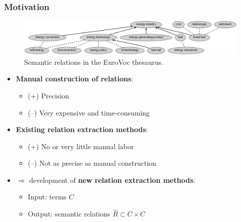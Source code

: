 \documentclass{beamer}
\begin{document}
\begin{frame}
\frametitle{Motivation}

\begin{figure}	
	\centering
		\includegraphics[width=1.0\textwidth]{figures/thesaurus2}
		\caption{Semantic relations in the EuroVoc thesaurus.}
\end{figure}

\pause
\begin{itemize}
  
\item \textbf{Manual construction of relations}:
\begin{itemize}
\item (+) Precision 
\item (--) Very expensive and time-consuming
\end{itemize}


\item \textbf{Existing relation extraction methods}:
\begin{itemize}
  \item (+) No or very little manual labor
  \item (--) Not as precise as manual construction  
  \end{itemize}

\pause

\item $\Longrightarrow$ development of \textbf{new relation extraction
methods}:
\begin{itemize}
  \item \alert{Input:} terms $C$
 \item \alert{Output:} semantic relations $\hat{R} \subset C \times C$  
\end{itemize}
\end{itemize}


\end{frame}
\end{document}
